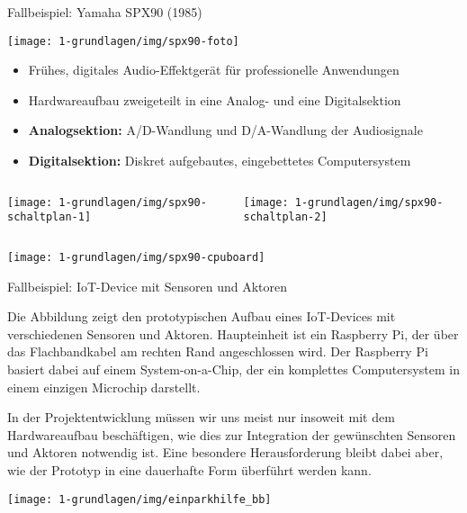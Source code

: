 \begin{frame}[allowframebreaks]{Fallbeispiel: Yamaha SPX90 (1985)}
    \begin{center}
        \texttt{[image: 1-grundlagen/img/spx90-foto]}
    \end{center}

    \smallskip

    \begin{itemize}
        \item Frühes, digitales Audio-Effektgerät für professionelle Anwendungen
        \item Hardwareaufbau zweigeteilt in eine Analog- und eine Digitalsektion
        \item \textbf{Analogsektion:} A/D-Wandlung und D/A-Wandlung der Audiosignale
        \item \textbf{Digitalsektion:} Diskret aufgebautes, eingebettetes Computersystem
    \end{itemize}

    \smallskip

    \begin{columns}
        \texttt{[image: 1-grundlagen/img/spx90-schaltplan-1]}

        \texttt{[image: 1-grundlagen/img/spx90-schaltplan-2]}
    \end{columns}

    \bigskip

    \texttt{[image: 1-grundlagen/img/spx90-cpuboard]}
\end{frame}

\begin{frame}{Fallbeispiel: IoT-Device mit Sensoren und Aktoren}
    \parbox{\linewidth}{
        \footnotesize
        Die Abbildung zeigt den prototypischen Aufbau eines IoT-Devices mit
        verschiedenen Sensoren und Aktoren. Haupteinheit ist ein Raspberry Pi,
        der über das Flachbandkabel am rechten Rand angeschlossen wird. Der
        Raspberry Pi basiert dabei auf einem System-on-a-Chip, der ein komplettes
        Computersystem in einem einzigen Microchip darstellt.

        \smallskip

        In der Projektentwicklung müssen wir uns meist nur insoweit mit dem
        Hardwareaufbau beschäftigen, wie dies zur Integration der gewünschten
        Sensoren und Aktoren notwendig ist. Eine besondere Herausforderung bleibt
        dabei aber, wie der Prototyp in eine dauerhafte Form überführt werden kann.
    }

    \bigskip

    \texttt{[image: 1-grundlagen/img/einparkhilfe\_bb]}
\end{frame}

